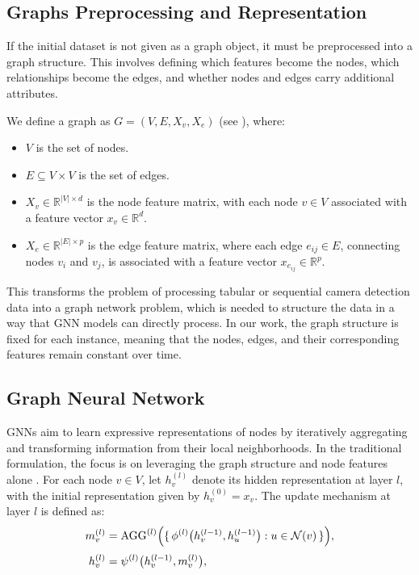 \documentclass[journal]{IEEEtran}
\begin{document}
\subsection{Graphs Preprocessing and Representation} \label{sec:graph_representation}

If the initial dataset is not given as a graph object, it must be preprocessed into a graph structure. This involves defining which features become the nodes, which relationships become the edges, and whether nodes and edges carry additional attributes.

We define a graph as $G = (V, E, X_v, X_e)$ (see \cite{gilmer2017neural,bora2023edge}), where:
\begin{itemize}
    \item $V$ is the set of nodes.
    \item $E \subseteq V \times V$ is the set of edges.
    \item $X_v \in \mathbb{R}^{|V| \times d}$ is the node feature matrix, with each node $v \in V$ associated with a feature vector $x_v \in \mathbb{R}^d$.
    \item $X_e \in \mathbb{R}^{|E| \times p}$ is the edge feature matrix, where each edge $e_{ij} \in E$, connecting nodes $v_i$ and $v_j$, is associated with a feature vector $x_{e_{ij}} \in \mathbb{R}^p$.
\end{itemize}

This transforms the problem of processing tabular or sequential camera detection data into a graph network problem, which is needed to structure the data in a way that GNN models can directly process. In our work, the graph structure is fixed for each instance, meaning that the nodes, edges, and their corresponding features remain constant over time.

\subsection{Graph Neural Network} \label{sec:gnn_subsec}

GNNs aim to learn expressive representations of nodes by iteratively aggregating and transforming information from their local neighborhoods. In the traditional formulation, the focus is on leveraging the graph structure and node features alone \cite{kipf2016semi,velivckovic2017graph}. For each node $v \in V$, let $h_v^{(l)}$ denote its hidden representation at layer $l$, with the initial representation given by $h_v^{(0)} = x_v$. The update mechanism at layer $l$ is defined as:
\begin{equation}
\label{eq:mp_traditional}
    \begin{aligned}
    m_v^{(l)} &= \operatorname{AGG}^{(l)}\Bigl(\{\, \phi^{(l)}\bigl(h_v^{(l-1)}, h_u^{(l-1)}\bigr) : u \in \mathcal{N}(v)\,\}\Bigr),\\[1mm]
    h_v^{(l)} &= \psi^{(l)}\bigl(h_v^{(l-1)}, m_v^{(l)}\bigr),
    \end{aligned}
\end{equation}
\end{document}

